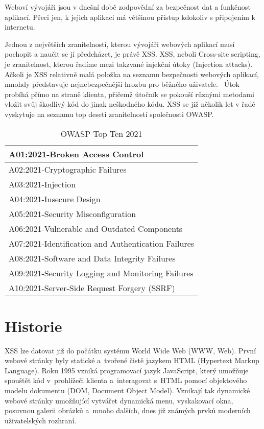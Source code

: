 \documentclass[11pt, conference, a4paper]{IEEEtran}
\begin{document}
Weboví vývojáři jsou v dnešní době zodpovědní za bezpečnost dat a funkčnost aplikací. Přeci jen, k jejich aplikaci má většinou přístup kdokoliv s připojením k internetu.

Jednou z největších zranitelností, kterou vývojáři webových aplikací musí pochopit a naučit se jí předcházet, je právě XSS. XSS, neboli Cross-site scripting, je zranitelnost, kterou řadíme mezi takzvané injekční útoky (Injection attacks). Ačkoli je XSS relativně malá položka na seznamu bezpečnosti webových aplikací, mnohdy představuje nejnebezpečnější hrozbu pro běžného uživatele.~\cite{Grossman2007} Útok probíhá přímo na straně klienta, přičemž útočník se pokouší různými metodami vložit svůj škodlivý kód do jinak neškodného kódu. XSS se již několik let v řadě vyskytuje na seznamu top deseti zranitelností společnosti OWASP.



\begin{table}[ht]
    \caption{OWASP Top Ten 2021 \cite{owasp-topten}}
    \label{tab:owasptop10}
    \centering
    \begin{tabular}{|l|}
        \hline
        A01:2021-Broken Access Control\\
        \hline
        A02:2021-Cryptographic Failures\\
        \hline
        A03:2021-Injection\\
        \hline
        A04:2021-Insecure Design\\
        \hline
        A05:2021-Security Misconfiguration\\
        \hline
        A06:2021-Vulnerable and Outdated Components\\
        \hline
        A07:2021-Identification and Authentication Failures\\
        \hline
        A08:2021-Software and Data Integrity Failures\\
        \hline
        A09:2021-Security Logging and Monitoring Failures\\
        \hline
        A10:2021-Server-Side Request Forgery (SSRF)\\
        \hline
    \end{tabular}
    
\end{table}

\section{Historie}
XSS lze datovat již do počátku systému World Wide Web (WWW, Web). První webové stránky byly statické a~tvořené čistě jazykem HTML (Hypertext Markup Language). Roku 1995 vzniká programovací jazyk JavaScript, který umožňuje spouštět kód v~prohlížeči klienta a~interagovat s~HTML pomocí objektového modelu dokumentu (DOM,  Document Object Model). Vznikají tak dynamické webové stránky umožňující vytvářet dynamická menu, vyskakovací okna, posuvnou galerii obrázků a~mnoho dalších, dnes již známých prvků moderních uživatelských rozhraní. 
\end{document}
